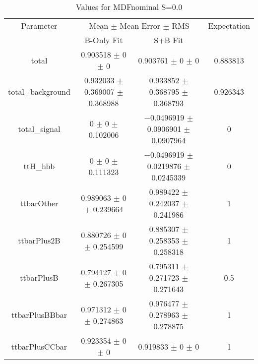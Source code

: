 \begin{table}
\centering
\caption{Values for MDFnominal S=0.0}
\begin{tabular}{cccc}
\toprule
Parameter & \multicolumn{2}{c}{Mean $\pm$ Mean Error $\pm$ RMS} & Expectation\\
 & B-Only Fit & S+B Fit & \\
\midrule
total & \num{0.903518} $\pm$ \num{0} $\pm$ \num{0} & \num{0.903761} $\pm$ \num{0} $\pm$ \num{0} & \num{0.883813}\\
total\_background & \num{0.932033} $\pm$ \num{0.369007} $\pm$ \num{0.368988} & \num{0.933852} $\pm$ \num{0.368795} $\pm$ \num{0.368793} & \num{0.926343}\\
total\_signal & \num{0} $\pm$ \num{0} $\pm$ \num{0.102006} & \num{-0.0496919} $\pm$ \num{0.0906901} $\pm$ \num{0.0907964} & \num{0}\\
ttH\_hbb & \num{0} $\pm$ \num{0} $\pm$ \num{0.111323} & \num{-0.0496919} $\pm$ \num{0.0219876} $\pm$ \num{0.0245339} & \num{0}\\
ttbarOther & \num{0.989063} $\pm$ \num{0} $\pm$ \num{0.239664} & \num{0.989422} $\pm$ \num{0.242037} $\pm$ \num{0.241986} & \num{1}\\
ttbarPlus2B & \num{0.880726} $\pm$ \num{0} $\pm$ \num{0.254599} & \num{0.885307} $\pm$ \num{0.258353} $\pm$ \num{0.258318} & \num{1}\\
ttbarPlusB & \num{0.794127} $\pm$ \num{0} $\pm$ \num{0.267305} & \num{0.795311} $\pm$ \num{0.271723} $\pm$ \num{0.271643} & \num{0.5}\\
ttbarPlusBBbar & \num{0.971312} $\pm$ \num{0} $\pm$ \num{0.274863} & \num{0.976477} $\pm$ \num{0.278963} $\pm$ \num{0.278875} & \num{1}\\
ttbarPlusCCbar & \num{0.923354} $\pm$ \num{0} $\pm$ \num{0} & \num{0.919833} $\pm$ \num{0} $\pm$ \num{0} & \num{1}\\
\bottomrule
\end{tabular}
\end{table}
